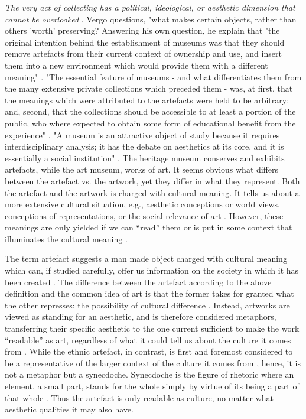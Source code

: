 \emph{The very act of collecting has a political, ideological, or aesthetic dimension that cannot be overlooked} \autocite[p. 2]{vergo_museology_1989}. Vergo questions, "what makes certain objects, rather than others 'worth' preserving? Answering his own question, he explain that "the original intention behind the establishment of museums was that they should remove artefacts from their current context of ownership and use, and insert them into a new environment which would provide them with a different meaning" \autocite[p. 6]{vergo_museology_1989}. "The essential feature of museums - and what differentiates them from the many extensive private collections which preceded them - was, at first, that the meanings which were attributed to the artefacts were held to be arbitrary; and, second, that the collections should be accessible to at least a portion of the public, who where expected to obtain some form of educational benefit from the experience" \autocite[p. 6]{vergo_museology_1989}. "A museum is an attractive object of study because it requires interdisciplinary analysis; it has the debate on aesthetics at its core, and it is essentially a social institution" \autocite[p. 202]{Thi_book}. The heritage museum conserves and exhibits artefacts, while the art museum, works of art. It seems obvious what differs between the artefact vs. the artwork, yet they differ in what they represent. Both the artefact and the artwork is charged with cultural meaning. It tells us about a more extensive cultural situation, e.g., aesthetic conceptions or world views, conceptions of representations, or the social relevance of art \autocite[p. 206]{Thi_book}. However, these meanings are only yielded if we can “read” them or is put in some context that illuminates the cultural meaning \autocite[p. 206]{Thi_book}.

The term artefact suggests a man made object charged with cultural meaning which can, if studied carefully, offer us information on the society in which it has been created \autocite[p. 205]{Thi_book}. The difference between the artefact according to the above definition and the common idea of art is that the former takes for granted what the other represses: the possibility of cultural difference \autocite[p. 205]{Thi_book}. Instead, artworks are viewed as standing for an aesthetic, and is therefore considered metaphors, transferring their specific aesthetic to the one current sufficient to make the work “readable” as art, regardless of what it could tell us about the culture it comes from \autocite[p. 206]{Thi_book}. While the ethnic artefact, in contrast, is first and foremost considered to be a representative of the larger context of the culture it comes from \autocite[p. 206]{Thi_book}, hence, it is not a metaphor but a synecdoche. Synecdoche is the figure of rhetoric where an element, a small part, stands for the whole simply by virtue of its being a part of that whole \autocite[p. 206]{Thi_book}. Thus the artefact is only readable as culture, no matter what aesthetic qualities it may also have.


